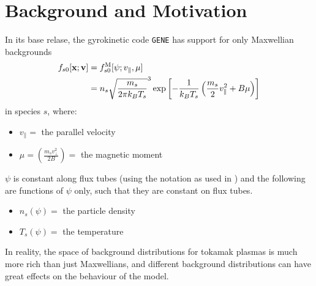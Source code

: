 \section{Background and Motivation}
    In its base relase, the gyrokinetic code {\tt GENE} has support for only Maxwellian backgrounds
    \begin{align}
        f_{s0}[\mathbf{x}; \mathbf{v}]  &=  f_{s0}^{\rm M}[\psi; v_{\parallel}, \mu]  \\
        &=  n_{s}\sqrt{\frac{m_{s}}{2\pi k_{B}T_{s}}}^{3}\exp\left[- \frac{1}{k_{B}T_{s}}\left(\frac{m_{s}}{2}v_{\parallel}^{2} + B\mu\right)\right]
    \end{align}
    in species $s$, where:
    \begin{itemize}
        \item  $v_{\parallel} =$ the parallel velocity
        \item  $\mu = \left(\frac{m_{s}v_{\perp}^{2}}{2B}\right) =$ the magnetic moment
    \end{itemize}
    $\psi$ is constant along flux tubes (using the notation as used in \cite{Abe+13}) and the following are functions of $\psi$ only, such that they are constant on flux tubes.
    \begin{itemize}
        \item  $n_{s}(\psi) =$ the particle density
        \item  $T_{s}(\psi) =$ the temperature
    \end{itemize}

    In reality, the space of background distributions for tokamak plasmas is much more rich than just Maxwellians, and different background distributions can have great effects on the behaviour of the model.
    
    
    
